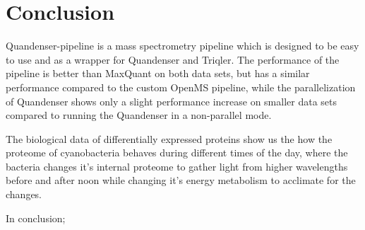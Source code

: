 \section{Conclusion}

Quandenser-pipeline is a mass spectrometry pipeline which is designed to be easy to use and as a wrapper for Quandenser and Triqler. The performance of the pipeline is better than MaxQuant on both data sets, but has a similar performance compared to the custom OpenMS pipeline, while the parallelization of Quandenser shows only a slight performance increase on smaller data sets compared to running the Quandenser in a non-parallel mode.

The biological data of differentially expressed proteins show us the how the proteome of cyanobacteria behaves during different times of the day, where the bacteria changes it's internal proteome to gather light from higher wavelengths before and after noon while changing it's energy metabolism to acclimate for the changes.

In conclusion;
